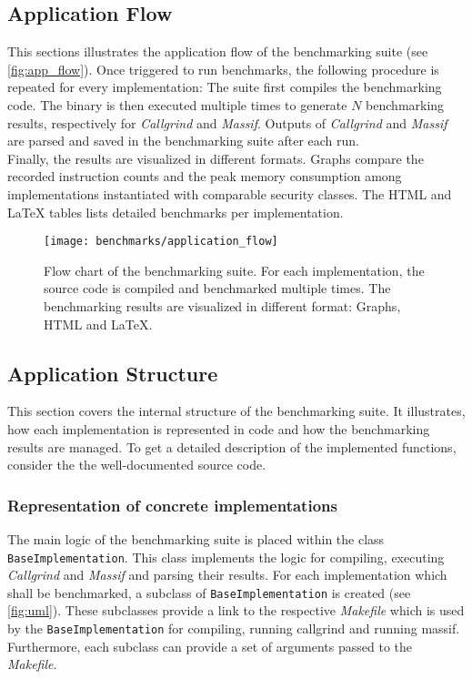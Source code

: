 \subsection{Application Flow}\label{sec:app_flow}
This sections illustrates the application flow of the benchmarking suite (see \autoref{fig:app_flow}). Once triggered to run benchmarks, the following procedure is repeated for every implementation: The suite first compiles the benchmarking code. The binary is then executed multiple times to generate $N$ benchmarking results, respectively for \textit{Callgrind} and \textit{Massif}. Outputs of \textit{Callgrind} and \textit{Massif} are parsed and saved in the benchmarking suite after each run.
\\
Finally, the results are visualized in different formats. Graphs compare the recorded instruction counts and the peak memory consumption among implementations instantiated with comparable security classes. The \gls{HTML} and LaTeX tables lists detailed benchmarks per implementation.

\begin{figure}[H]
  \centering
  \texttt{[image: benchmarks/application\_flow]}
  \caption[Flow chart of the benchmarking suite.]
  {Flow chart of the benchmarking suite. For each implementation, the source code is compiled and benchmarked multiple times. The benchmarking results are visualized in different format: Graphs, \gls{HTML} and LaTeX.
  } \label{fig:app_flow}
\end{figure}




\subsection{Application Structure}\label{sec:app_structure}

This section covers the internal structure of the benchmarking suite. It illustrates, how each implementation is represented in code and how the benchmarking results are managed. To get a detailed description of the implemented functions, consider the the well-documented source code.

\subsubsection{Representation of concrete implementations}

The main logic of the benchmarking suite is placed within the class \texttt{BaseImplementation}. This class implements the logic for compiling, executing \textit{Callgrind} and \textit{Massif} and parsing their results. For each implementation which shall be benchmarked, a subclass of \texttt{BaseImplementation} is created (see \autoref{fig:uml}). These subclasses provide a link to the respective \textit{Makefile} which is used by the \texttt{BaseImplementation} for compiling, running callgrind and running massif. Furthermore, each subclass can provide a set of arguments passed to the \textit{Makefile}.\\

